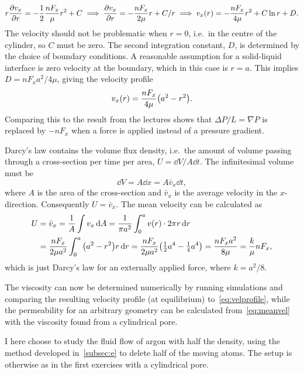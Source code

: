 \documentclass[11pt,british,a4paper]{report}
\begin{document}
\begin{equation}
    r\pdv{v_x}{r} = -\frac{1}{2}\frac{nF_x}{\mu}r^2 + C
    \implies \pdv{v_x}{r} = -\frac{nF_x}{2\mu}r + C/r
    \implies v_x(r) = -\frac{nF_x}{4\mu}r^2 + C\ln r + D.
\end{equation}
The velocity should not be problematic when \(r=0\), i.e.\ in the centre of the cylinder, so \(C\) must be zero. The second integration constant, \(D\), is determined by the choice of boundary conditions. A reasonable assumption for a solid-liquid interface is zero velocity at the boundary, which in this case is \(r=a\). This implies \(D=nF_xa^2/4\mu\), giving the velocity profile
\begin{equation}
    v_x(r) = \frac{nF_x}{4\mu}\qty(a^2-r^2).\label{eq:velprofile}
\end{equation}
Comparing this to the result from the lectures shows that \(\Delta P/L = \nabla P\) is replaced by \(-nF_x\) when a force is applied instead of a pressure gradient.

Darcy's law contains the volume flux density, i.e.\ the amount of volume passing through a cross-section per time per area, \(U=\dd{V}/A\dd{t}\). The infinitesimal volume must be
\begin{equation}
\dd{V}=A\dd{x}=A\bar{v}_x\dd{t},
\end{equation}
where \(A\) is the area of the cross-section and \(\bar{v}_x\) is the average velocity in the \(x\)-direction. Consequently \(U=\bar{v}_x\). The mean velocity can be calculated as
\begin{alignat}{2}
    U &= \bar{v}_x = \frac{1}{A}\int v_x \dd{A} = \frac{1}{\pi a^2}\int_0^a v(r)\cdot 2\pi r\dd{r}\\
    &= \frac{nF_x}{2\mu a^2}\int_0^a \qty(a^2-r^2)r\dd{r}
    = \frac{nF_x}{2\mu a^2}\qty(\tfrac{1}{2}a^4-\tfrac{1}{4}a^4)
    = \frac{nF_xa^2}{8\mu} = \frac{k}{\mu} nF_x,\label{eq:meanvel}
\end{alignat}
which is just Darcy's law for an externally applied force, where \(k=a^2/8\).

The viscosity can now be determined numerically by running simulations and comparing the resulting velocity profile (at equilibrium) to~\vref{eq:velprofile}, while the permeability for an arbitrary geometry can be calculated from~\vref{eq:meanvel} with the viscosity found from a cylindrical pore.

I here choose to study the fluid flow of argon with half the density, using the method developed in~\vref{subsec:e} to delete half of the moving atoms. The setup is otherwise as in the first exercises with a cylindrical pore.
\end{document}
